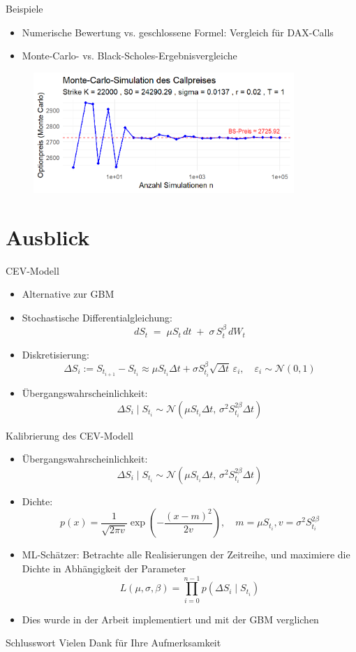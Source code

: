 \documentclass{beamer}
\begin{document}
\begin{frame}{Beispiele}
  \begin{itemize}
      \item Numerische Bewertung vs. geschlossene Formel: Vergleich für DAX-Calls
      \item Monte-Carlo- vs. Black-Scholes-Ergebnisvergleiche
  \end{itemize}
  \begin{figure}
    \centering
  \includegraphics[width=0.88\textwidth]{../thesis/images/call_dax_mc.png}
  \end{figure}
\end{frame}

\section{Ausblick}

\begin{frame}{CEV-Modell}
  \begin{itemize}
    \item Alternative zur GBM
    \item Stochastische Differentialgleichung: $$dS_t \;=\; \mu S_t\,dt \;+\; \sigma\,S_t^{\beta}\,dW_t$$
    \item Diskretisierung: $$\Delta S_i := S_{t_{i+1}} - S_{t_i} \approx \mu S_{t_i}\Delta t + \sigma S_{t_i}^{\beta}\sqrt{\Delta t}\,\varepsilon_i,\quad \varepsilon_i\sim\mathcal N(0,1)$$
    \item Übergangswahrscheinlichkeit: $$\Delta S_i \mid S_{t_i} \sim \mathcal N\left(\mu S_{t_i} \Delta t,\, \sigma^2 S_{t_i}^{2\beta} \Delta t\right)$$
  \end{itemize}
\end{frame}

\begin{frame}{Kalibrierung des CEV-Modell}
  \begin{itemize}
    \item Übergangswahrscheinlichkeit: $$\Delta S_i \mid S_{t_i} \sim \mathcal N\left(\mu S_{t_i} \Delta t,\, \sigma^2 S_{t_i}^{2\beta} \Delta t\right)$$
    \item Dichte: $$p(x) = \frac{1}{\sqrt{2\pi v}} \exp\left(-\frac{(x-m)^2}{2v}\right),\quad m = \mu S_{t_i}, v = \sigma^2 S_{t_i}^{2 \beta}$$
    \item ML-Schätzer: Betrachte alle Realisierungen der Zeitreihe, und maximiere die Dichte in Abhängigkeit der Parameter
  $$L(\mu, \sigma, \beta) = \prod_{i=0}^{n-1} p(\Delta S_i \mid S_{t_i})$$
    \item Dies wurde in der Arbeit implementiert und mit der GBM verglichen
  \end{itemize}
\end{frame}

\begin{frame}{Schlusswort}
  \centering
  \Huge Vielen Dank für Ihre Aufmerksamkeit\\
\end{frame}
\end{document}
